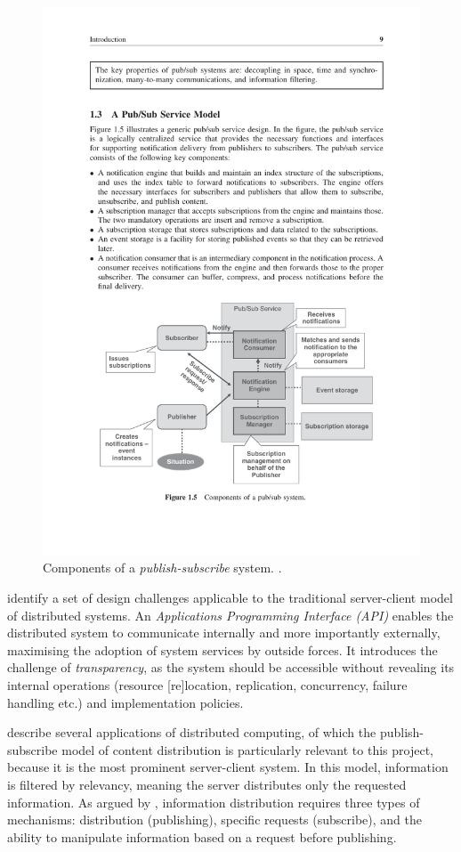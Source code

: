 \documentclass[../report.tex]{subfiles}
\begin{document}
\begin{figure}
\centering
\includegraphics[width=0.8\linewidth]{figures/pubsubsystem.pdf}
\caption{Components of a \textit{publish-subscribe} system. \cite[9]{tarkoma2012publish}.}
\label{fig:pubsubsystem}
\end{figure}

\cite{kshemkalyani2011distributed} identify a set of design challenges applicable to the traditional server-client model of distributed systems. An \textit{Applications Programming Interface (API)} enables the distributed system to communicate internally and more importantly externally, maximising the adoption of system services by outside forces. It introduces the challenge of \textit{transparency}, as the system should be accessible without revealing its internal operations (resource [re]location, replication, concurrency, failure handling etc.) and implementation policies.

\cite{kshemkalyani2011distributed} describe several applications of distributed computing, of which the publish-subscribe model of content distribution is particularly relevant to this project, because it is the most prominent server-client system. In this model, information is filtered by relevancy, meaning the server distributes only the requested information. As argued by \cite{kshemkalyani2011distributed}, information distribution requires three types of mechanisms: distribution (publishing), specific requests (subscribe), and the ability to manipulate information based on a request before publishing. \\
\end{document}
